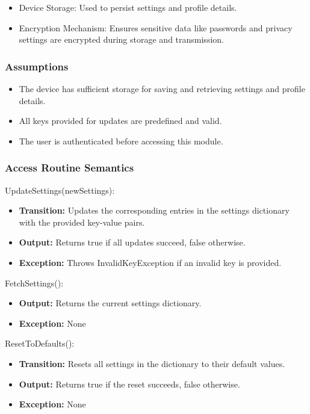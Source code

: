 \documentclass[12pt, titlepage]{article}
\begin{document}
\begin{itemize}
  \item Device Storage: Used to persist settings and profile details.
  \item Encryption Mechanism: Ensures sensitive data like passwords and privacy settings are encrypted during storage and transmission.
\end{itemize}

\subsubsection{Assumptions}

\begin{itemize}
  \item The device has sufficient storage for saving and retrieving settings and profile details.
  \item All keys provided for updates are predefined and valid.
  \item The user is authenticated before accessing this module.
\end{itemize}

\subsubsection{Access Routine Semantics}

\noindent UpdateSettings(newSettings):
\begin{itemize}
  \item \textbf{Transition:} Updates the corresponding entries in the settings dictionary with the provided key-value pairs.
  \item \textbf{Output:} Returns true if all updates succeed, false otherwise.
  \item \textbf{Exception:} Throws InvalidKeyException if an invalid key is provided.
\end{itemize}

\noindent FetchSettings():
\begin{itemize}
  \item \textbf{Output:} Returns the current settings dictionary.
  \item \textbf{Exception:} None
\end{itemize}

\noindent ResetToDefaults():
\begin{itemize}
  \item \textbf{Transition:} Resets all settings in the dictionary to their default values.
  \item \textbf{Output:} Returns true if the reset succeeds, false otherwise.
  \item \textbf{Exception:} None
\end{itemize}
\end{document}
